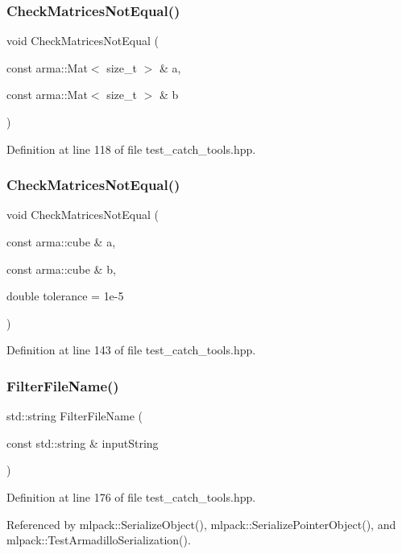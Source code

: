\subsubsection{Check\+Matrices\+Not\+Equal()\hspace{0.1cm}{\footnotesize\ttfamily [2/3]}}
{\footnotesize\ttfamily void Check\+Matrices\+Not\+Equal (\begin{DoxyParamCaption}\item[{const arma\+::\+Mat$<$ size\+\_\+t $>$ \&}]{a,  }\item[{const arma\+::\+Mat$<$ size\+\_\+t $>$ \&}]{b }\end{DoxyParamCaption})\hspace{0.3cm}{\ttfamily [inline]}}



Definition at line 118 of file test\+\_\+catch\+\_\+tools.\+hpp.

\mbox{\label{test__catch__tools_8hpp_ab8511b32e7ccb9f8b0c09b92f810908f}} 
\subsubsection{Check\+Matrices\+Not\+Equal()\hspace{0.1cm}{\footnotesize\ttfamily [3/3]}}
{\footnotesize\ttfamily void Check\+Matrices\+Not\+Equal (\begin{DoxyParamCaption}\item[{const arma\+::cube \&}]{a,  }\item[{const arma\+::cube \&}]{b,  }\item[{double}]{tolerance = {\ttfamily 1e-\/5} }\end{DoxyParamCaption})\hspace{0.3cm}{\ttfamily [inline]}}



Definition at line 143 of file test\+\_\+catch\+\_\+tools.\+hpp.

\mbox{\label{test__catch__tools_8hpp_a2bef90617ddbfbbfc128fed05612d17a}} 
\subsubsection{Filter\+File\+Name()}
{\footnotesize\ttfamily std\+::string Filter\+File\+Name (\begin{DoxyParamCaption}\item[{const std\+::string \&}]{input\+String }\end{DoxyParamCaption})\hspace{0.3cm}{\ttfamily [inline]}}



Definition at line 176 of file test\+\_\+catch\+\_\+tools.\+hpp.



Referenced by mlpack\+::\+Serialize\+Object(), mlpack\+::\+Serialize\+Pointer\+Object(), and mlpack\+::\+Test\+Armadillo\+Serialization().

